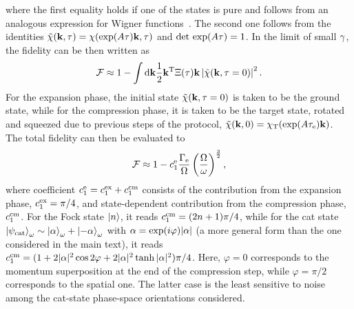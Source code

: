 \documentclass[reprint,prx,footinbib,floatfix,twocolumn,longbibliography,superscriptaddress]{revtex4-2}
\begin{document}
where the first equality holds if one of the states is pure and follows from an analogous expression for Wigner functions~\cite{Liang2019}.
The second one follows from the identities $\tilde{\chi}(\mathbf{k},\tau) = \chi(\text{exp}(A \tau) \mathbf{k}, \tau)$ and $\text{det} \ \text{exp}(A \tau) = 1$.
In the limit of small $\gamma$, the fidelity can be then written as
\begin{equation}
     \mathcal{F} \approx 1 - \int \dd \mathbf{k} \frac{1}{2} \mathbf{k}^{\text{T}} \Xi (\tau) \mathbf{k} \left| \tilde{\chi} (\mathbf{k},\tau=0) \right|^2.
\end{equation}
For the expansion phase, the initial state $\tilde{\chi} (\mathbf{k},\tau=0) $ is taken to be the ground state, while for the compression phase, it is taken to be the target state, rotated and squeezed due to previous steps of the protocol, $\tilde{\chi} (\mathbf{k},0) = \chi_\text{T} (\text{exp}(A \tau_{\text{e}}) \mathbf{k})$.
The total fidelity can then be evaluated to 
\begin{equation}
     \mathcal{F} \approx 1 - c_1^{\text{e}} \frac{\Gamma_{\text{e}}}{\Omega} \left( \frac{\Omega}{\omega}\right)^{\frac{3}{2}},
\end{equation}
where coefficient $c_1^{\text{e}} = c_1^\text{ex} + c_1^\text{cm} $ consists of the contribution from the expansion phase, $c_1^\text{ex} = \pi / 4$, and state-dependent contribution from the compression phase, $c_1^\text{cm}$.
For the Fock state $\ket{n}$, it reads $c_1^\text{cm} = (2n+1) \pi / 4$, while for the cat state $\ket{\psi_{\text{cat}}}_{\omega} \sim \ket{\alpha}_{\omega} + \ket{-\alpha}_{\omega}$ with $\alpha = \text{exp}(i \varphi) |\alpha |$ (a more general form than the one considered in the main text), it reads $c_1^\text{cm} = (1+2 |\alpha|^2 \cos {2 \varphi} + 2 |\alpha|^2 \tanh{|\alpha|^2} ) \pi / 4$.
Here, $\varphi = 0$ corresponds to the momentum superposition at the end of the compression step, while $\varphi = \pi/2$ corresponds to the spatial one.
The latter case is the least sensitive to noise among the cat-state phase-space orientations considered.


\renewcommand{\theequation}{C\arabic{equation}}
\setcounter{equation}{0}
\end{document}

